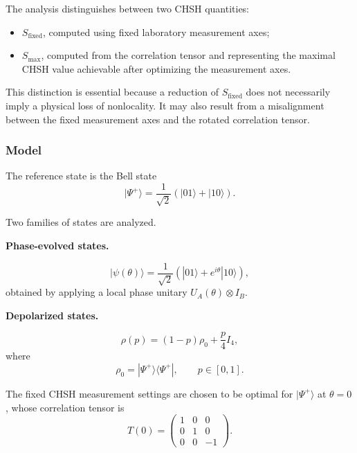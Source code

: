 \documentclass[a4paper]{article}
\begin{document}
The analysis distinguishes between two CHSH quantities:

\begin{itemize}
    \item \( S_{\mathrm{fixed}} \), computed using fixed laboratory measurement axes;
    \item \( S_{\max} \), computed from the correlation tensor and representing the maximal CHSH value achievable after optimizing the measurement axes.
\end{itemize}

\medskip

This distinction is essential because a reduction of \( S_{\mathrm{fixed}} \) does not necessarily imply a physical loss of nonlocality. It may also result from a misalignment between the fixed measurement axes and the rotated correlation tensor.

\medskip


\subsubsection{Model}

The reference state is the Bell state
\[
|\Psi^+\rangle
=
\frac{1}{\sqrt{2}}
\left(
|01\rangle + |10\rangle
\right).
\]

\medskip

Two families of states are analyzed.

\medskip

\textbf{Phase-evolved states.}

\[
|\psi(\theta)\rangle
=
\frac{1}{\sqrt{2}}
\left(
|01\rangle + e^{i\theta}|10\rangle
\right),
\]
obtained by applying a local phase unitary \( U_A(\theta) \otimes I_B \).

\medskip

\textbf{Depolarized states.}

\[
\rho(p)
=
(1-p)\rho_0
+
\frac{p}{4}I_4,
\]
where
\[
\rho_0 = |\Psi^+\rangle\langle\Psi^+|,
\qquad
p \in [0,1].
\]

\medskip

The fixed CHSH measurement settings are chosen to be optimal for \( |\Psi^+\rangle \) at \( \theta = 0 \), whose correlation tensor is
\[
T(0) =
\begin{pmatrix}
1 & 0 & 0 \\
0 & 1 & 0 \\
0 & 0 & -1
\end{pmatrix}.
\]
\end{document}
